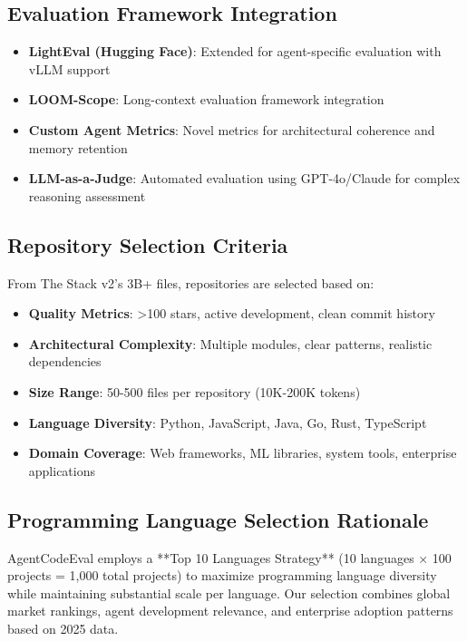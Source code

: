 \documentclass{article}
\begin{document}
\subsection{Evaluation Framework Integration}
\begin{itemize}
    \item \textbf{LightEval (Hugging Face)}: Extended for agent-specific evaluation with vLLM support
    \item \textbf{LOOM-Scope}: Long-context evaluation framework integration
    \item \textbf{Custom Agent Metrics}: Novel metrics for architectural coherence and memory retention
    \item \textbf{LLM-as-a-Judge}: Automated evaluation using GPT-4o/Claude for complex reasoning assessment
\end{itemize}

\subsection{Repository Selection Criteria}
From The Stack v2's 3B+ files, repositories are selected based on:
\begin{itemize}
    \item \textbf{Quality Metrics}: >100 stars, active development, clean commit history
    \item \textbf{Architectural Complexity}: Multiple modules, clear patterns, realistic dependencies
    \item \textbf{Size Range}: 50-500 files per repository (10K-200K tokens)
    \item \textbf{Language Diversity}: Python, JavaScript, Java, Go, Rust, TypeScript
    \item \textbf{Domain Coverage}: Web frameworks, ML libraries, system tools, enterprise applications
\end{itemize}

\subsection{Programming Language Selection Rationale}

AgentCodeEval employs a **Top 10 Languages Strategy** (10 languages × 100 projects = 1,000 total projects) to maximize programming language diversity while maintaining substantial scale per language. Our selection combines global market rankings, agent development relevance, and enterprise adoption patterns based on 2025 data.
\end{document}
